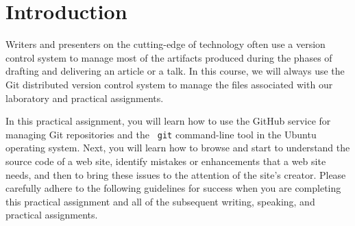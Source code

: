 

\usepackage[compact]{titlesec}



\vspace*{-.2in}
\section*{Introduction}

Writers and presenters on the cutting-edge of technology often use a version control system to manage most of the
artifacts produced during the phases of drafting and delivering an article or a talk. In this course, we will always use
the Git distributed version control system to manage the files associated with our laboratory and practical assignments.

In this practical assignment, you will learn how to use the GitHub service for managing Git repositories and the {\tt
git} command-line tool in the Ubuntu operating system. Next, you will learn how to browse and start to understand the
source code of a web site, identify mistakes or enhancements that a web site needs, and then to bring these issues to
the attention of the site's creator. Please carefully adhere to the following guidelines for success when you are
completing this practical assignment and all of the subsequent writing, speaking, and practical assignments.

